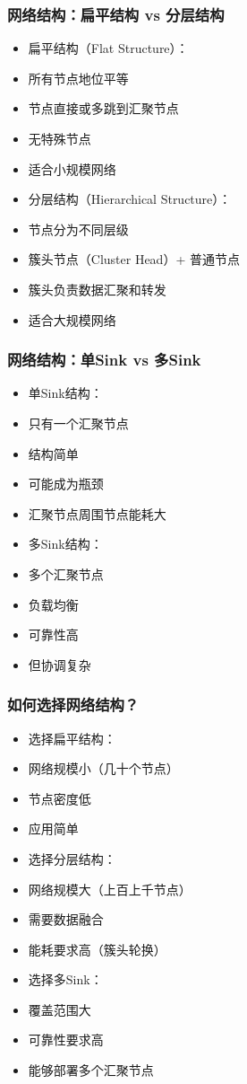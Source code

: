 \documentclass[aspectratio=43]{beamer}
\begin{document}
\begin{frame}
  \frametitle{网络结构：扁平结构 vs 分层结构}

  \begin{itemize}
  \item<+-> 扁平结构（Flat Structure）：
  \item<+-> 所有节点地位平等
  \item<+-> 节点直接或多跳到汇聚节点
  \item<+-> 无特殊节点
  \item<+-> 适合小规模网络
  \item<+-> 分层结构（Hierarchical Structure）：
  \item<+-> 节点分为不同层级
  \item<+-> 簇头节点（Cluster Head）+ 普通节点
  \item<+-> 簇头负责数据汇聚和转发
  \item<+-> 适合大规模网络
  \end{itemize}
\end{frame}

\begin{frame}
  \frametitle{网络结构：单Sink vs 多Sink}

  \begin{itemize}
  \item<+-> 单Sink结构：
  \item<+-> 只有一个汇聚节点
  \item<+-> 结构简单
  \item<+-> 可能成为瓶颈
  \item<+-> 汇聚节点周围节点能耗大
  \item<+-> 多Sink结构：
  \item<+-> 多个汇聚节点
  \item<+-> 负载均衡
  \item<+-> 可靠性高
  \item<+-> 但协调复杂
  \end{itemize}
\end{frame}

\begin{frame}
  \frametitle{如何选择网络结构？}

  \begin{itemize}
  \item<+-> 选择扁平结构：
  \item<+-> 网络规模小（几十个节点）
  \item<+-> 节点密度低
  \item<+-> 应用简单
  \item<+-> 选择分层结构：
  \item<+-> 网络规模大（上百上千节点）
  \item<+-> 需要数据融合
  \item<+-> 能耗要求高（簇头轮换）
  \item<+-> 选择多Sink：
  \item<+-> 覆盖范围大
  \item<+-> 可靠性要求高
  \item<+-> 能够部署多个汇聚节点
  \end{itemize}
\end{frame}
\end{document}
